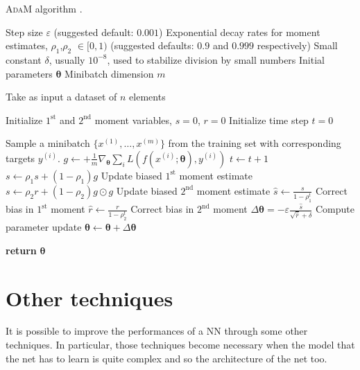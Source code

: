 \begin{algorithm}[H]
\caption{\textsc{AdaM} algorithm \cite{deeplearningbook}.}\label{alg:ADAM}
\begin{algorithmic}[1]
\Require Step size $\varepsilon$ (suggested default: $0.001$)
\Require Exponential decay rates for moment estimates, $\rho_1$,$\rho_2$ $\in [0,1)$ (suggested defaults: $0.9$ and $0.999$ respectively)
\Require Small constant $\delta$, usually $10^{-8}$, used to stabilize division by small numbers
\Require Initial parameters $\bm{\theta}$
\Require Minibatch dimension $m$

 \Comment Take as input a dataset of $n$ elements

\State Initialize $1^\text{st}$ and $2^\text{nd}$ moment variables, $s=0$, $r=0$
\State Initialize time step $t=0$

\State Sample a minibatch $\{x^{(1)},\dots,x^{(m)}\}$ from the training set with corresponding targets $y^{(i)}$.
\State $g \gets + \frac{1}{m} \nabla_{\bm{\theta}} \sum_{i} L(f(x^{(i)};\bm{\theta}), y^{(i)})$ 
\State $t \gets t+1$
\State $s \gets \rho_1 s + (1-\rho_1) g$    \Comment Update biased $1^\text{st}$ moment estimate
\State $s \gets \rho_2 r + (1-\rho_2) g \odot g$    \Comment Update biased $2^\text{nd}$ moment estimate
\State $\hat{s} \gets \frac{s}{1 - \rho^t_1}$   \Comment Correct bias in $1^\text{st}$ moment
\State $\hat{r} \gets \frac{r}{1 - \rho^t_2}$   \Comment Correct bias in $2^\text{nd}$ moment
\State $\Delta \bm{\theta} = - \varepsilon \frac{\hat{s}}{\sqrt{\hat{r}} + \delta}$ \Comment Compute parameter update
\State $\bm{\theta} \gets \bm{\theta} + \Delta \bm{\theta}$
\EndWhile

\State \textbf{return} $\bm{\theta}$
\EndProcedure
\end{algorithmic}
\end{algorithm}





\section{Other techniques}
It is possible to improve the performances of a NN through some other techniques. In particular, those techniques become necessary when the model that the net has to learn is quite complex and so the architecture of the net too.



